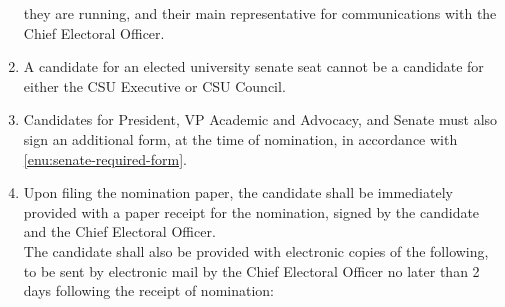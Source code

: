 \documentclass[oneside]{book}
\begin{document}
\begin{enumerate}
they are running, and their main representative for communications
with the Chief Electoral Officer. 
\item A candidate for an elected university senate seat cannot be a candidate
for either the CSU Executive or CSU Council. 
\item \label{enu:pres-VPAA-senate-requirement}Candidates for President,
VP Academic and Advocacy, and Senate must also sign an additional
form, at the time of nomination, in accordance with \autoref{enu:senate-required-form}. 
\item \label{enu:nomination-filing-receipt}Upon filing the nomination paper,
the candidate shall be immediately provided with a paper receipt for
the nomination, signed by the candidate and the Chief Electoral Officer.
\\
 The candidate shall also be provided with electronic copies of the
following, to be sent by electronic mail by the Chief Electoral Officer
no later than 2 days following the receipt of nomination:


\end{enumerate}
\end{document}
